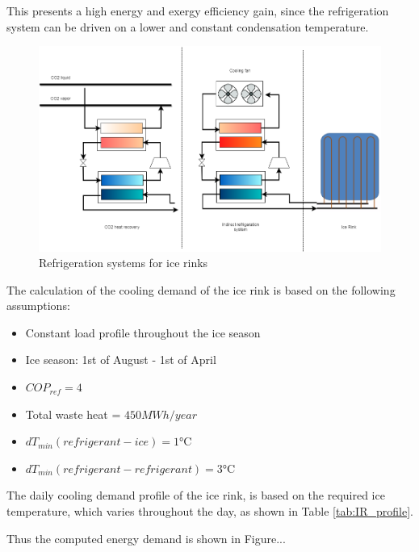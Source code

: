 \documentclass{article}
\begin{document}
This presents a high energy and exergy efficiency gain, since the refrigeration system can be driven on a lower and constant condensation temperature.

\begin{figure}[htp]
	\centering
	\includegraphics[width=1\textwidth]{IceRink_refrigeration.png}
	\caption{Refrigeration systems for ice rinks}
	\label{fig:IR_refSystem}
\end{figure}

The calculation of the cooling demand of the ice rink is based on the following assumptions:
\begin{itemize}
	\item Constant load profile throughout the ice season
	\item Ice season: 1st of August - 1st of April
	\item $COP_{ref} = 4$ \cite{karampourMEASUREMENTMODELLINGICE}
	\item Total waste heat = $ 450 MWh/year$ \cite{kolasniewskiEvaluationModellingIce}
	\item $dT_{min}(refrigerant-ice) = 1 \si{\celsius}$
	\item $dT_{min}(refrigerant-refrigerant) = 3 \si{\celsius}$
\end{itemize}

The daily cooling demand profile of the ice rink, is based on the required ice temperature, which varies throughout the day\cite{karampourMEASUREMENTMODELLINGICE}, as shown in Table \ref{tab:IR_profile}.



Thus the computed energy demand is shown in Figure...
\end{document}
